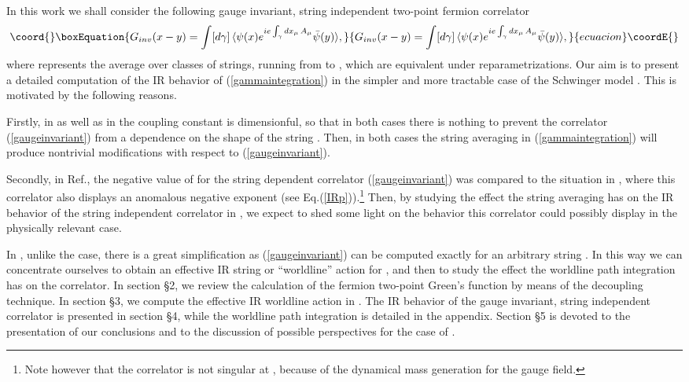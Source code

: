 \documentclass[a4paper,12pt]{article}
\begin{document}
In this work we shall consider the following gauge invariant, string independent two-point fermion correlator 
\begin{equation}\coord{}\boxEquation{
G_{inv}(x-y)=\int [d\gamma]\, \langle \psi(x)e^{ie\int_\gamma dx_\mu\, A_\mu} \bar{\psi}(y) \rangle,
\label{gammaintegration}
}{
G_{inv}(x-y)=\int [d\gamma]\, \langle \psi(x)e^{ie\int_\gamma dx_\mu\, A_\mu} \bar{\psi}(y) \rangle,
}{ecuacion}\coordE{}\end{equation}
where \myHighlight{$\int[d\gamma]$}\coordHE{} represents the average over classes of strings, running from \coordHE{} to \coordHE{}, which are equivalent under reparametrizations. Our aim is to present a detailed computation of the IR behavior of (\ref{gammaintegration}) in the simpler and more tractable case of the Schwinger model \cite{sch}. This is motivated by the following reasons. 

Firstly, in \coordHE{} as well as in \coordHE{} the coupling constant is dimensionful, so that in both cases there is nothing to prevent the correlator (\ref{gaugeinvariant}) from a dependence on the shape of the string \myHighlight{$\gamma$}\coordHE{}. Then, in both cases the string averaging in (\ref{gammaintegration}) will produce nontrivial modifications with respect to (\ref{gaugeinvariant}). 

Secondly, in Ref.\cite{k1}, the negative value of \myHighlight{$\eta$}\coordHE{} for the \coordHE{} string dependent correlator (\ref{gaugeinvariant}) was compared to the situation in \coordHE{}, where this correlator also displays an anomalous negative exponent (see Eq.(\ref{IRp})).\footnote{Note however that the \coordHE{} correlator is not singular at \coordHE{}, because of the dynamical mass generation for the gauge field.} Then, by studying the effect the string averaging has on the IR behavior of the  string independent correlator in \coordHE{}, we expect to shed some light on the behavior this correlator could possibly display in the physically relevant \coordHE{} case. 

In \coordHE{}, unlike the \coordHE{} case, there is a great simplification as (\ref{gaugeinvariant}) can be computed exactly for an arbitrary string \myHighlight{$\gamma$}\coordHE{}. In this way we can concentrate ourselves to obtain an effective IR string or ``worldline'' action for \myHighlight{$\gamma$}\coordHE{}, and then to study the effect the worldline path integration has on the correlator.
In section \S 2, we review the calculation of the fermion two-point Green's function by means of 
the decoupling technique. In section \S 3, we compute the effective IR worldline action in 
\coordHE{}. The IR behavior of the gauge invariant, string independent correlator is presented 
in section \S 4, while the worldline path integration is detailed in the appendix.
Section \S 5 is devoted to the presentation of our conclusions and to the discussion of possible perspectives for the case of \coordHE{}.
\end{document}
